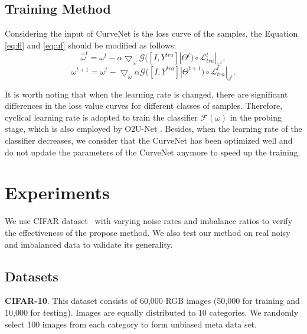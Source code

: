 \documentclass[letterpaper]{article} %
\newcommand{\bd}[1]{\textbf{#1}}
\begin{document}
\subsection{Training Method}

Considering the input of CurveNet is the loss curve of the samples, the Equation \ref{eq:fl} and \ref{eq:uf} should be modified as follows:
\vspace{-0.20cm} 
\begin{equation}
    \hat{\omega}^{t} = \omega^{t} - \alpha \bigtriangledown_\omega \mathcal{G}([I, Y^{tra}]|\Theta^{t}) \circ \mathcal{L}^{t}_{tra}|_{\omega^{t}},
    \label{eq:fl_our}
\end{equation}
\vspace{-0.20cm} 
\begin{equation}
    \omega^{t+1} = \omega^{t} - \bigtriangledown_\omega \alpha \mathcal{G}([I, Y^{tra}]|\Theta^{t+1}) \circ \mathcal{L}^{t}_{tra}|_{\omega^{t}}.
    \label{eq:uf_our}
\end{equation}

It is worth noting that when the learning rate is changed, there are significant differences in the loss value curves for different classes of samples.
Therefore, cyclical learning rate \cite{smith2017cyclical} is adopted to train the classifier $\mathcal{F}(\omega)$ in the probing stage, which is also employed by O2U-Net \cite{huang2019o2u}.
Besides, when the learning rate of the classifier decreases, we consider that the CurveNet has been optimized well and do not update the parameters of the CurveNet anymore to speed up the training.

\section{Experiments}
We use CIFAR dataset~\cite{krizhevsky2009learning} with varying noise rates and imbalance ratios to verify the effectiveness of the propose method. We also test our method on real noisy and imbalanced data to validate its generality. 

\subsection{Datasets} \label{sec:dataset}

\noindent\bd{CIFAR-10}. 
This dataset consists of 60,000 RGB images (50,000 for training and 10,000 for testing). Images are equally distributed to 10 categories.
We randomly select 100 images from each category to form unbiased meta data set.
\end{document}
